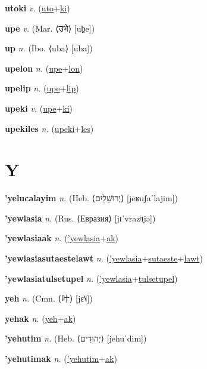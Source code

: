 \textbf{\hypertarget{utoki}{utoki}} \textit{v.} (\hyperlink{uto}{uto}+\allowbreak \hyperlink{ki}{ki})


\textbf{\hypertarget{upe}{upe}} \textit{v.} (Mar. ⟨{\devanagari{}उभे}⟩ [ub̤e])


\textbf{\hypertarget{up}{up}} \textit{n.} (Ibo. ⟨uba⟩ [uba])


\textbf{\hypertarget{upelon}{upelon}} \textit{n.} (\hyperlink{upe}{upe}+\allowbreak \hyperlink{lon}{lon})


\textbf{\hypertarget{upelip}{upelip}} \textit{n.} (\hyperlink{upe}{upe}+\allowbreak \hyperlink{lip}{lip})


\textbf{\hypertarget{upeki}{upeki}} \textit{v.} (\hyperlink{upe}{upe}+\allowbreak \hyperlink{ki}{ki})


\textbf{\hypertarget{upekiles}{upekiles}} \textit{n.} (\hyperlink{upeki}{upeki}+\allowbreak \hyperlink{les}{les})


\section{Y}

\textbf{\hypertarget{'yelucalayim}{'yelucalayim}} \textit{n.} (Heb. ⟨{\hebrew{}יְרוּשָׁלַיִם}⟩ [jeʁuʃaˈlajim])


\textbf{\hypertarget{'yewlasia}{'yewlasia}} \textit{n.} (Rus. ⟨Евразия⟩ [jɪˈvrazʲɪjə])


\textbf{\hypertarget{'yewlasiaak}{'yewlasiaak}} \textit{n.} (\hyperlink{'yewlasia}{'yewlasia}+\allowbreak \hyperlink{ak}{ak})


\textbf{\hypertarget{'yewlasiasutaestelawt}{'yewlasiasutaestelawt}} \textit{n.} (\hyperlink{'yewlasia}{'yewlasia}+\allowbreak \hyperlink{sutaeste}{sutaeste}+\allowbreak \hyperlink{lawt}{lawt})


\textbf{\hypertarget{'yewlasiatulsetupel}{'yewlasiatulsetupel}} \textit{n.} (\hyperlink{'yewlasia}{'yewlasia}+\allowbreak \hyperlink{tulsetupel}{tulsetupel})


\textbf{\hypertarget{yeh}{yeh}} \textit{n.} (Cmn. ⟨{\chinese{}叶}⟩ [jɛ˥˩])


\textbf{\hypertarget{yehak}{yehak}} \textit{n.} (\hyperlink{yeh}{yeh}+\allowbreak \hyperlink{ak}{ak})


\textbf{\hypertarget{'yehutim}{'yehutim}} \textit{n.} (Heb. ⟨{\hebrew{}יְהוּדִים}⟩ [jehuˈdim])


\textbf{\hypertarget{'yehutimak}{'yehutimak}} \textit{n.} (\hyperlink{'yehutim}{'yehutim}+\allowbreak \hyperlink{ak}{ak})


